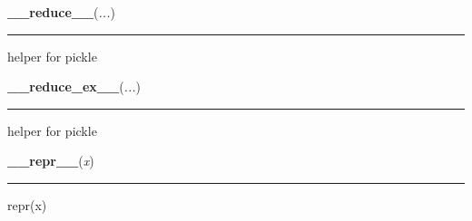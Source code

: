     \label{object:__reduce__}

    \vspace{0.5ex}

    \begin{boxedminipage}{\textwidth}

    \raggedright \textbf{\_\_reduce\_\_}(\textit{...})

    \vspace{-1.5ex}

    \rule{\textwidth}{0.5\fboxrule}

helper for pickle
    \vspace{1ex}

    \end{boxedminipage}

    \label{object:__reduce_ex__}

    \vspace{0.5ex}

    \begin{boxedminipage}{\textwidth}

    \raggedright \textbf{\_\_reduce\_ex\_\_}(\textit{...})

    \vspace{-1.5ex}

    \rule{\textwidth}{0.5\fboxrule}

helper for pickle
    \vspace{1ex}

    \end{boxedminipage}

    \label{object:__repr__}

    \vspace{0.5ex}

    \begin{boxedminipage}{\textwidth}

    \raggedright \textbf{\_\_repr\_\_}(\textit{x})

    \vspace{-1.5ex}

    \rule{\textwidth}{0.5\fboxrule}

repr(x)
    \vspace{1ex}

    \end{boxedminipage}

    \label{object:__setattr__}

